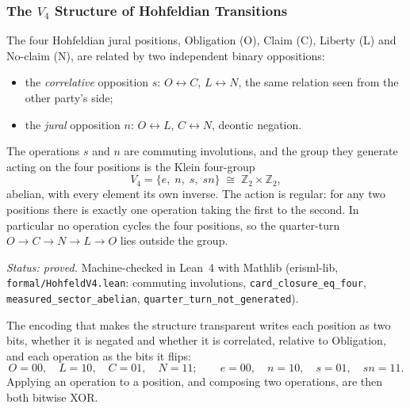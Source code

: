 
\subsubsection{The $V_4$ Structure of Hohfeldian Transitions}\label{sec:hohfeld-v4}

The four Hohfeldian jural positions, Obligation (O), Claim (C), Liberty (L) and No-claim (N), are
related by two independent binary oppositions:
\begin{itemize}
  \item the \emph{correlative} opposition $s$: $O \leftrightarrow C$, $L \leftrightarrow N$, the
        same relation seen from the other party's side;
  \item the \emph{jural} opposition $n$: $O \leftrightarrow L$, $C \leftrightarrow N$, deontic
        negation.
\end{itemize}

\begin{proposition}\label{GE-PROP-8-3-V4}
The operations $s$ and $n$ are commuting involutions, and the group they generate acting on the
four positions is the Klein four-group
\[
  V_4 = \{e,\; n,\; s,\; sn\} \;\cong\; \mathbb{Z}_2 \times \mathbb{Z}_2 ,
\]
abelian, with every element its own inverse. The action is regular: for any two positions there is
exactly one operation taking the first to the second. In particular no operation cycles the four
positions, so the quarter-turn $O \to C \to N \to L \to O$ lies outside the group.
\end{proposition}

\noindent\emph{Status: proved.} Machine-checked in Lean~4 with Mathlib (erisml-lib,
\texttt{formal/HohfeldV4.lean}: commuting involutions, \texttt{card\_closure\_eq\_four},
\texttt{measured\_sector\_abelian}, \texttt{quarter\_turn\_not\_generated}).

The encoding that makes the structure transparent writes each position as two bits, whether it is
negated and whether it is correlated, relative to Obligation, and each operation as the bits it
flips:
\[
  O = 00,\quad L = 10,\quad C = 01,\quad N = 11; \qquad e = 00,\quad n = 10,\quad s = 01,\quad sn = 11 .
\]
Applying an operation to a position, and composing two operations, are then both bitwise XOR.

